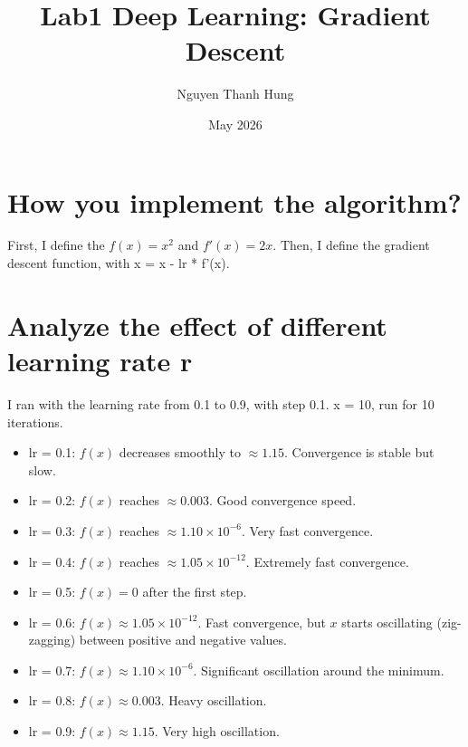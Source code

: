 \documentclass{article}
\title{Lab1 Deep Learning: Gradient Descent}
\author{Nguyen Thanh Hung}
\date{May 2026}
\begin{document}
\maketitle

\section{How you implement the algorithm?}

First, I define the $f(x) = x^2$ and $f'(x) = 2x$. 
Then, I define the gradient descent function, with x = x - lr * f'(x). 

\section{Analyze the effect of different learning rate r}

I ran with the learning rate from 0.1 to 0.9, with step 0.1. x = 10, run for 10 iterations. 

\begin{itemize}
    \item lr = 0.1: $f(x)$ decreases smoothly to $\approx 1.15$. Convergence is stable but slow.
    \item lr = 0.2: $f(x)$ reaches $\approx 0.003$. Good convergence speed.
    \item lr = 0.3: $f(x)$ reaches $\approx 1.10 \times 10^{-6}$. Very fast convergence.
    \item lr = 0.4: $f(x)$ reaches $\approx 1.05 \times 10^{-12}$. Extremely fast convergence.
    \item lr = 0.5: $f(x) = 0$ after the first step.
    \item lr = 0.6: $f(x) \approx 1.05 \times 10^{-12}$. Fast convergence, but $x$ starts oscillating (zig-zagging) between positive and negative values.
    \item lr = 0.7: $f(x) \approx 1.10 \times 10^{-6}$. Significant oscillation around the minimum.
    \item lr = 0.8: $f(x) \approx 0.003$. Heavy oscillation.
    \item lr = 0.9: $f(x) \approx 1.15$. Very high oscillation.
\end{itemize}
\end{document}
